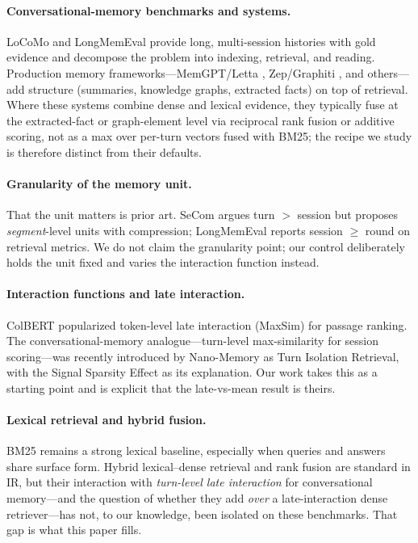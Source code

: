\documentclass[10pt,twocolumn]{article}
\begin{document}
\paragraph{Conversational-memory benchmarks and systems.}
LoCoMo \citep{locomo} and LongMemEval \citep{longmemeval} provide long,
multi-session histories with gold evidence and decompose the problem into
indexing, retrieval, and reading. Production memory frameworks---MemGPT/Letta
\citep{memgpt}, Zep/Graphiti \citep{zep}, and others---add structure
(summaries, knowledge graphs, extracted facts) on top of retrieval. Where
these systems combine dense and lexical evidence, they typically fuse at the
extracted-fact or graph-element level via reciprocal rank fusion
\citep{rrf} or additive scoring, not as a max over per-turn vectors fused
with BM25; the recipe we study is therefore distinct from their defaults.

\paragraph{Granularity of the memory unit.}
That the unit matters is prior art. SeCom \citep{secom} argues turn $>$
session but proposes \emph{segment}-level units with compression; LongMemEval
reports session $\ge$ round on retrieval metrics. We do not claim the
granularity point; our control deliberately holds the unit fixed and varies
the interaction function instead.

\paragraph{Interaction functions and late interaction.}
ColBERT \citep{colbert} popularized token-level late interaction (MaxSim) for
passage ranking. The conversational-memory analogue---turn-level
max-similarity for session scoring---was recently introduced by Nano-Memory
\citep{nanomemory} as Turn Isolation Retrieval, with the Signal Sparsity Effect
as its explanation. Our work takes this as a starting point and is explicit
that the late-vs-mean result is theirs.

\paragraph{Lexical retrieval and hybrid fusion.}
BM25 \citep{bm25} remains a strong lexical baseline, especially when queries
and answers share surface form. Hybrid lexical--dense retrieval and rank
fusion \citep{rrf} are standard in IR, but their interaction with
\emph{turn-level late interaction} for conversational memory---and the
question of whether they add \emph{over} a late-interaction dense
retriever---has not, to our knowledge, been isolated on these benchmarks.
That gap is what this paper fills.
\end{document}
